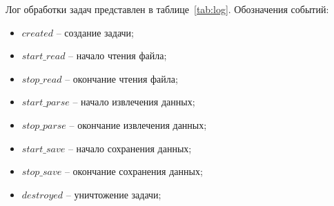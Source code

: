 Лог обработки задач представлен в таблице~\ref{tab:log}. Обозначения событий:
\begin{itemize}
	\item $created$ -- создание задачи;
	\item $start\_read$ -- начало чтения файла;
	\item $stop\_read$ -- окончание чтения файла;
	\item $start\_parse$ -- начало извлечения данных;
	\item $stop\_parse$ -- окончание извлечения данных;
	\item $start\_save$ -- начало сохранения данных;
	\item $stop\_save$ -- окончание сохранения данных;
	\item $destroyed$ -- уничтожение задачи;
\end{itemize}

